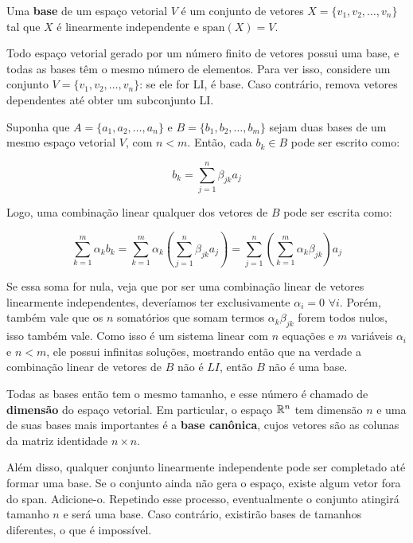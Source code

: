 \documentclass[11pt, a4paper]{article}
\begin{document}
Uma \textbf{base} de um espaço vetorial \(V\) é um conjunto de vetores \(X = \{v_1, v_2, \ldots, v_n\}\) tal que \(X\) é linearmente independente e \(\text{span}(X) = V\).

Todo espaço vetorial gerado por um número finito de vetores possui uma base, e todas as bases têm o mesmo número de elementos. Para ver isso, considere um conjunto \(V = \{v_1, v_2, \ldots, v_n\}\): se ele for LI, é base. Caso contrário, remova vetores dependentes até obter um subconjunto LI.

Suponha que \(A = \{a_1, a_2, \ldots, a_n\}\) e \(B = \{b_1, b_2, \ldots, b_m\}\) sejam duas bases de um mesmo espaço vetorial \(V\), com \(n < m\). Então, cada \(b_k \in B\) pode ser escrito como:

\void[-0.9]

\[
b_k = \sum_{j=1}^{n} \beta_{jk} a_j
\]

\void[-0.3]

Logo, uma combinação linear qualquer dos vetores de $B$ pode ser escrita como:

\void[-0.8]

\[
\sum_{k=1}^m \alpha_k b_k = \sum_{k=1}^m \alpha_k \left( \sum_{j=1}^n \beta_{jk} a_j \right) = \sum_{j=1}^n \left( \sum_{k=1}^m \alpha_k \beta_{jk} \right) a_j
\]

Se essa soma for nula, veja que por ser uma combinação linear de vetores linearmente independentes, deveríamos ter exclusivamente \(\alpha_i=0\) \(\forall i\). Porém, também vale que os \(n\) somatórios que somam termos \(\alpha_k\beta_{jk}\) forem todos nulos, isso também vale. Como isso é um sistema linear com \(n\) equações e \(m\) variáveis \(\alpha_ i\) e \(n<m\), ele possui infinitas soluções, mostrando então que na verdade a combinação linear de vetores de \(B\) não é \(LI\), então \(B\) não é uma base.

Todas as bases então tem o mesmo tamanho, e esse número é chamado de \textbf{dimensão} do espaço vetorial. Em particular, o espaço \(\mathbb{R}^n\) tem dimensão \(n\) e uma de suas bases mais importantes é a \textbf{base canônica}, cujos vetores são as colunas da matriz identidade \(n \times n\).

Além disso, qualquer conjunto linearmente independente pode ser completado até formar uma base. Se o conjunto ainda não gera o espaço, existe algum vetor fora do span. Adicione-o. Repetindo esse processo, eventualmente o conjunto atingirá tamanho \(n\) e será uma base. Caso contrário, existirão bases de tamanhos diferentes, o que é impossível.
\end{document}
